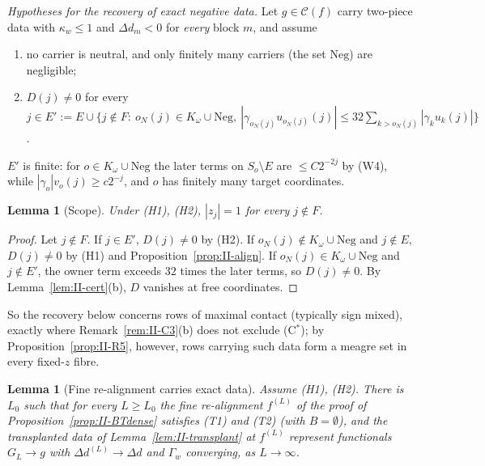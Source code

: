 \documentclass[10pt]{amsart}
\newtheorem{lemma}[theorem]{Lemma}
\theoremstyle{definition}
\theoremstyle{remark}
\newcommand{\Cset}{\mathcal C}
\begin{document}
\noindent\emph{Hypotheses for the recovery of exact negative data.}  Let
$g\in\Cset(f)$ carry two-piece data with $\kappa_w\le1$ and $\Delta d_m<0$ for
\emph{every} block $m$, and assume
\begin{enumerate}
\item[(H1)] no carrier is neutral, and only finitely many carriers (the set
$\mathrm{Neg}$) are negligible;
\item[(H2)] $D(j)\ne0$ for every $j\in E':=E\cup\{j\notin F:\ o_N(j)\in K_\omega\cup
\mathrm{Neg},\ |\gamma_{o_N(j)}u_{o_N(j)}(j)|\le32\sum_{k>o_N(j)}|\gamma_ku_k(j)|\}$.
\end{enumerate}
$E'$ is finite: for $o\in K_\omega\cup\mathrm{Neg}$ the later terms on $S_o\setminus E$
are $\le C2^{-2j}$ by (W4), while $|\gamma_o|v_o(j)\ge c2^{-j}$, and $o$ has finitely
many target coordinates.

\begin{lemma}[Scope]\label{lem:II-scope}
Under \textup{(H1)}, \textup{(H2)}, $|z_j|=1$ for every $j\notin F$.
\end{lemma}

\begin{proof}
Let $j\notin F$.  If $j\in E'$, $D(j)\ne0$ by (H2).  If $o_N(j)\notin K_\omega\cup
\mathrm{Neg}$ and $j\notin E$, $D(j)\ne0$ by (H1) and
Proposition~\ref{prop:II-align}.  If $o_N(j)\in K_\omega\cup\mathrm{Neg}$ and $j\notin
E'$, the owner term exceeds $32$ times the later terms, so $D(j)\ne0$.  By
Lemma~\ref{lem:II-cert}(b), $D$ vanishes at free coordinates.
\end{proof}

So the recovery below concerns rows of maximal contact (typically sign
mixed), exactly where Remark~\ref{rem:II-C3}(b) does not exclude (C$^*$); by
Proposition~\ref{prop:II-R5}, however, rows carrying such data form a meagre
set in every fixed-$z$ fibre.

\begin{lemma}[Fine re-alignment carries exact data]\label{lem:II-finealign}
Assume \textup{(H1)}, \textup{(H2)}.  There is $L_0$ such that for every $L\ge
L_0$ the fine re-alignment $f^{(L)}$ of the proof of
Proposition~\textup{\ref{prop:II-BTdense}} satisfies \textup{(T1)} and
\textup{(T2)} \textup{(}with $B=\emptyset$\textup{)}, and the transplanted data
of Lemma~\textup{\ref{lem:II-transplant}} at $f^{(L)}$ represent functionals
$G_L\to g$ with $\Delta d^{(L)}\to\Delta d$ and $\Gamma_w$ converging, as
$L\to\infty$.
\end{lemma}
\end{document}

